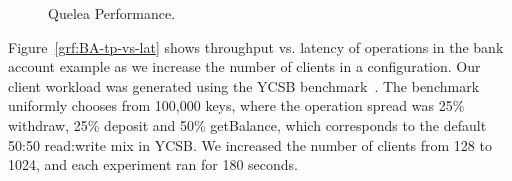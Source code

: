 \begin{figure}
  \vspace{-5pt}
  \centering
	\caption{Quelea Performance.}
  \label{grf:LWW_perf}
\end{figure}

Figure~\ref{grf:BA-tp-vs-lat} shows throughput vs. latency of operations
in the bank account example as we increase the number of clients in a 
configuration. Our client workload was generated using the YCSB
benchmark~\cite{YCSB}. The benchmark uniformly chooses from 100,000 keys, where
the operation spread was 25\% withdraw, 25\% deposit and 50\% getBalance, which
corresponds to the default 50:50 read:write mix in YCSB. We increased the
number of clients from 128 to 1024, and each experiment ran for 180 seconds.

